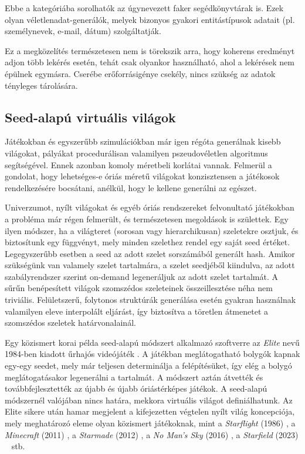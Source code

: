 \documentclass[
    parspace,
    noindent,
    nohyp,
]{elteiktdk}[2023/04/10]
\newcommand{\todoref}[1]{\todo[inline, noinlinepar, color=red, textcolor=white, inlinewidth=0.6cm, caption={#1}]{\large \textbf{×}}}
\begin{document}
Ebbe a kategóriába sorolhatók az úgynevezett faker segédkönyvtárak is.
Ezek olyan véletlenadat-generálók,
melyek bizonyos gyakori entitástípusok adatait (pl. személynevek, e-mail, dátum) szolgáltatják.
\todoref{+CITE: faker segédkönyvtárak}

Ez a megközelítés természetesen nem is törekszik arra,
hogy koherens eredményt adjon több lekérés esetén,
tehát csak olyankor használható, ahol a lekérések nem épülnek egymásra.
Cserébe erőforrásigénye csekély, nincs szükség az adatok tényleges tárolására.
\todoref{kérések mockolása: az on-demand schema ennek a koherenssé tett változata is}

\subsection{Seed-alapú virtuális világok}

Játékokban és egyszerűbb szimulációkban már igen régóta generálnak kisebb világokat,
pályákat procedurálisan valamilyen pszeudovéletlen algoritmus segítségével.
Ennek azonban komoly méretbeli korlátai vannak.
Felmerül a gondolat, hogy lehetséges-e óriás méretű világokat konzisztensen
a játékosok rendelkezésére bocsátani, anélkül, hogy le kellene generálni az egészet.

Univerzumot, nyílt világokat és egyéb óriás rendszereket felvonultató játékokban
a probléma már régen felmerült, és természetesen megoldások is születtek.
Egy ilyen módszer, ha a világteret (sorosan vagy hierarchikusan)
szeletekre osztjuk, és biztosítunk egy függvényt,
mely minden szelethez rendel egy saját seed értéket.
Legegyszerűbb esetben a seed az adott szelet sorszámából generált hash.
Amikor szükségünk van valamely szelet tartalmára, a szelet seedjéből kiindulva,
az adott szabályrendszer szerint on-demand legeneráljuk az adott szelet tartalmát.
A sűrűn benépesített világok szomszédos szeleteinek összeillesztése néha nem triviális.
Felületszerű, folytonos struktúrák generálása esetén gyakran használnak
valamilyen eleve interpolált eljárást,
így biztosítva a töretlen átmenetet a szomszédos szeletek határvonalainál.

Egy közismert korai példa seed-alapú módszert alkalmazó szoftverre
az \textit{Elite} nevű 1984-ben kiadott űrhajós videójáték
\todoref{+CITE: Játék: Elite (1984)}.
A játékban meglátogatható bolygók kapnak egy-egy seedet, mely már teljesen determinálja a felépítésüket,
így elég a bolygó meglátogatásakor legenerálni a tartalmát.
A módszert aztán átvették és továbbfejlesztették az újabb és újabb óriástérképes játékok.
A seed-alapú módszernél valójában nincs határa, mekkora virtuális világot definiálhatunk.
Az Elite sikere után hamar megjelent a kifejezetten végtelen nyílt világ koncepciója,
mely meghatározó eleme olyan közismert játékoknak,
mint a \textit{Starflight} (1986) \todoref{+CITE: Játék: Starflight (1986)},
a \textit{Minecraft} (2011) \todoref{+CITE: Játék: Minecraft (2011)},
a \textit{Starmade} (2012) \todoref{+CITE: Játék: Starmade (2012)},
a \textit{No Man's Sky} (2016) \todoref{+CITE: Játék: No Man's Sky (2016)},
a \textit{Starfield} (2023) \todoref{+CITE: Játék: Starfield (2023)}~
stb.
\end{document}
